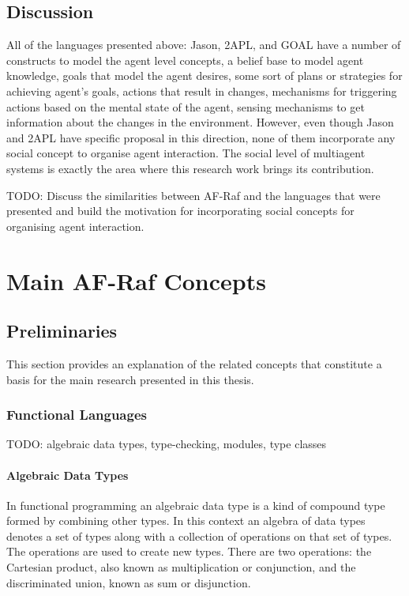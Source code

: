 \documentclass[a4paper,12pt,oneside,fleqn]{book} %
\theoremstyle{plain}
\theoremstyle{definition}
\theoremstyle{remark}
\begin{document}
\section{Discussion} %

All of the languages presented above: Jason, 2APL, and GOAL have a number
of constructs to model the agent level concepts, a belief base to model
agent knowledge, goals that model the agent desires, some sort of plans or
strategies for achieving agent's goals, actions that result in changes,
mechanisms for triggering actions based on the mental state of the agent,
sensing mechanisms to get information about the changes in the environment.
However, even though Jason and 2APL have specific proposal in this
direction, none of them incorporate any social concept to organise agent
interaction. The social level of multiagent systems is exactly the area
where this research work brings its contribution.

TODO: Discuss the similarities between AF-Raf and the languages that were
presented and build the motivation for incorporating social concepts for
organising agent interaction.


\chapter{Main AF-Raf Concepts} %

\section{Preliminaries} %

This section provides an explanation of the related concepts that
constitute a basis for the main research presented in this thesis.

\subsection{Functional Languages} %

TODO: algebraic data types, type-checking, modules, type classes

\subsubsection{Algebraic Data Types}

In functional programming an algebraic data type is a kind of compound type
formed by combining other types. In this context an algebra of data types
denotes a set of types along with a collection of operations on that set of
types. The operations are used to create new types. There are two
operations: the Cartesian product, also known as multiplication or
conjunction,  and the discriminated union, known as sum or disjunction.
\end{document}
